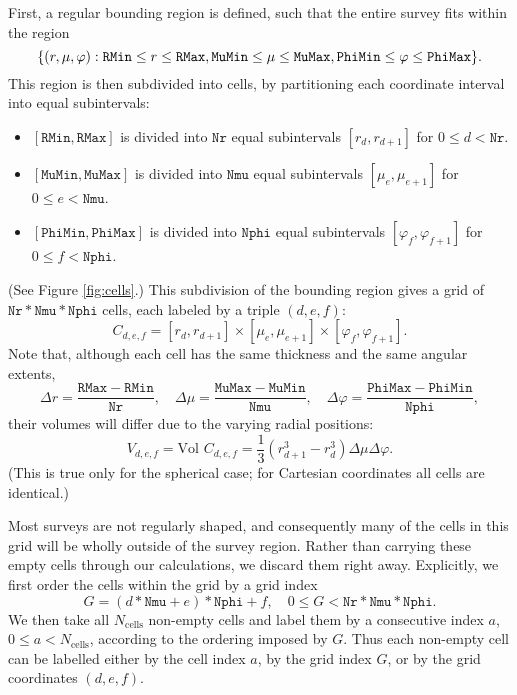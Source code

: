 \documentclass{article}
\renewcommand{\phi}{\varphi}
\newcommand{\RMin}{\mathtt{RMin}}
\newcommand{\RMax}{\mathtt{RMax}}
\newcommand{\MuMin}{\mathtt{MuMin}}
\newcommand{\MuMax}{\mathtt{MuMax}}
\newcommand{\PhiMin}{\mathtt{PhiMin}}
\newcommand{\PhiMax}{\mathtt{PhiMax}}
\newcommand{\Nr}{\mathtt{Nr}}
\newcommand{\Nmu}{\mathtt{Nmu}}
\newcommand{\Nphi}{\mathtt{Nphi}}
\begin{document}
First, a regular bounding region is defined, such that the entire survey fits
within the region
\begin{equation}
    \{(r,\mu,\phi) : \RMin \le r \le \RMax, \MuMin \le \mu \le \MuMax, \PhiMin \le \phi \le \PhiMax\}. \\
\end{equation}
This region is then subdivided into cells, by partitioning each coordinate
interval into equal subintervals:
\begin{itemize}
\item $[\RMin,\RMax]$ is divided into $\Nr$ equal subintervals $[r_d,r_{d+1}]$ for $0 \le d < \Nr$.
\item $[\MuMin,\MuMax]$ is divided into $\Nmu$ equal subintervals $[\mu_e,\mu_{e+1}]$ for $0 \le e < \Nmu$.
\item $[\PhiMin,\PhiMax]$ is divided into $\Nphi$ equal subintervals $[\phi_f,\phi_{f+1}]$ for $0 \le f < \Nphi$.
\end{itemize}
(See Figure \ref{fig:cells}.)  This subdivision of the bounding region gives
a grid of $\Nr*\Nmu*\Nphi$ cells, each labeled by a triple $(d,e,f)$:
\begin{equation}
    C_{d,e,f} = [r_d,r_{d+1}]\times[\mu_e,\mu_{e+1}]\times[\phi_f,\phi_{f+1}].
\end{equation}
Note that, although each cell has the same thickness and the same angular extents,
\begin{equation}
    \Delta r = \frac{\RMax-\RMin}{\Nr}, \quad
    \Delta\mu = \frac{\MuMax-\MuMin}{\Nmu}, \quad
    \Delta\phi = \frac{\PhiMax-\PhiMin}{\Nphi},
\end{equation}
their volumes will differ due to the varying radial positions:
\begin{equation}
    V_{d,e,f} = \text{Vol } C_{d,e,f}
    = \frac{1}{3} (r_{d+1}^3-r_d^3) \Delta\mu \Delta\phi.
\end{equation}
(This is true only for the spherical case; for Cartesian coordinates all cells
are identical.)

Most surveys are not regularly shaped, and consequently many of the cells in
this grid will be wholly outside of the survey region.  Rather than carrying
these empty cells through our calculations, we discard them right away.
Explicitly, we first order the cells within the grid by a grid index
\begin{equation}
    G = (d*\Nmu + e)*\Nphi + f, \quad 0 \le G < \Nr*\Nmu*\Nphi.
\end{equation}
We then take all $N_\text{cells}$ non-empty cells and label them by a
consecutive index $a$, $0 \le a < N_\text{cells}$, according to the ordering
imposed by $G$.  Thus each non-empty cell can be labelled either by the cell
index $a$, by the grid index $G$, or by the grid coordinates $(d,e,f)$.
\end{document}
